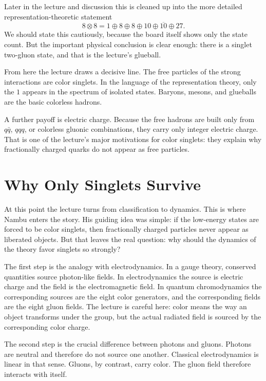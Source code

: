 Later in the lecture and discussion this is cleaned up into the more detailed representation-theoretic statement
\begin{equation}
8\otimes8 = 1\oplus8\oplus8\oplus10\oplus\overline{10}\oplus27.
\end{equation}
We should state this cautiously, because the board itself shows only the state count. But the important physical conclusion is clear enough: there is a singlet two-gluon state, and that is the lecture's glueball.

From here the lecture draws a decisive line. The free particles of the strong interactions are color singlets. In the language of the representation theory, only the \(1\) appears in the spectrum of isolated states. Baryons, mesons, and glueballs are the basic colorless hadrons.

A further payoff is electric charge. Because the free hadrons are built only from \(q\bar q\), \(qqq\), or colorless gluonic combinations, they carry only integer electric charge. That is one of the lecture's major motivations for color singlets: they explain why fractionally charged quarks do not appear as free particles.

\section{Why Only Singlets Survive}

At this point the lecture turns from classification to dynamics. This is where Nambu enters the story. His guiding idea was simple: if the low-energy states are forced to be color singlets, then fractionally charged particles never appear as liberated objects. But that leaves the real question: why should the dynamics of the theory favor singlets so strongly?

The first step is the analogy with electrodynamics. In a gauge theory, conserved quantities source photon-like fields. In electrodynamics the source is electric charge and the field is the electromagnetic field. In quantum chromodynamics the corresponding sources are the eight color generators, and the corresponding fields are the eight gluon fields. The lecture is careful here: color means the way an object transforms under the group, but the actual radiated field is sourced by the corresponding color charge.

The second step is the crucial difference between photons and gluons. Photons are neutral and therefore do not source one another. Classical electrodynamics is linear in that sense. Gluons, by contrast, carry color. The gluon field therefore interacts with itself.

